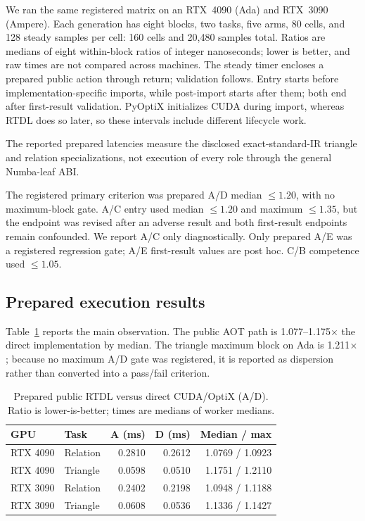 \documentclass[sigplan,screen,review,anonymous]{acmart}
\newcommand{\rtdl}{\textsc{RTDL}\xspace}
\begin{document}
We ran the same registered matrix on an RTX~4090 (Ada) and RTX~3090 (Ampere).
Each generation has eight blocks, two tasks, five arms, 80 cells, and 128 steady
samples per cell: 160 cells and 20,480 samples total. Ratios are medians of eight
within-block ratios of integer nanoseconds; lower is better, and raw times are
not compared across machines. The steady timer encloses a prepared public action
through return; validation follows. Entry starts before implementation-specific
imports, while post-import starts after them; both end after first-result
validation. PyOptiX initializes CUDA during import, whereas \rtdl does so later,
so these intervals include different lifecycle work.

The reported prepared latencies measure the disclosed exact-standard-IR
triangle and relation specializations, not execution of every role through the
general Numba-leaf ABI.

The registered primary criterion was prepared A/D median $\leq1.20$, with no
maximum-block gate. A/C entry used median $\leq1.20$ and maximum $\leq1.35$, but
the endpoint was revised after an adverse result and both first-result endpoints
remain confounded. We report A/C only diagnostically. Only prepared A/E was a
registered regression gate; A/E first-result values are post hoc. C/B competence
used $\leq1.05$.

\subsection{Prepared execution results}

Table~\ref{tab:prepared} reports the main observation. The public AOT path is
1.077--1.175$\times$ the direct implementation by median. The triangle maximum
block on Ada is 1.211$\times$; because no maximum A/D gate was registered, it is
reported as dispersion rather than converted into a pass/fail criterion.

\begin{table}[t]
  \caption{Prepared public \rtdl versus direct CUDA/OptiX (A/D). Ratio is
  lower-is-better; times are medians of worker medians.}
  \label{tab:prepared}
  \small
  \begin{tabular}{@{}llrrr@{}}
    \toprule
    GPU & Task & A (ms) & D (ms) & Median / max \\
    \midrule
    RTX 4090 & Relation & 0.2810 & 0.2612 & 1.0769 / 1.0923 \\
    RTX 4090 & Triangle & 0.0598 & 0.0510 & 1.1751 / 1.2110 \\
    RTX 3090 & Relation & 0.2402 & 0.2198 & 1.0948 / 1.1188 \\
    RTX 3090 & Triangle & 0.0608 & 0.0536 & 1.1336 / 1.1427 \\
    \bottomrule
  \end{tabular}
\end{table}
\end{document}
